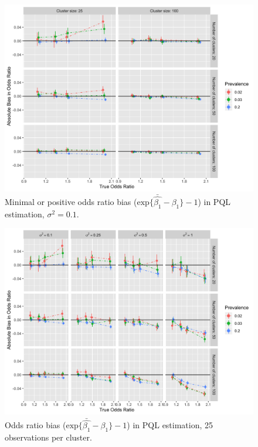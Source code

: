 \documentclass[Afour,times,sagev,doublespace]{sagej}
\begin{document}
\begin{figure}
\centering
\includegraphics[width=\linewidth]{_bias_pql_sbspt1.png}
  \caption{Minimal or positive odds ratio bias ($\text{exp} \{ \bar{\hat{\beta_1}} - \beta_1 \} - 1$) in PQL estimation, $\sigma^2=0.1$.}
    \label{fig:_bias_pql_sbs_pt1}
\end{figure}

\begin{figure}
\centering
\includegraphics[width=\linewidth]{_bias_pql_all_sbs.png}
  \caption{Odds ratio bias ($\text{exp} \{ \bar{\hat{\beta_1}} - \beta_1 \} - 1$) in PQL estimation, 25 observations per cluster.}
    \label{fig:_bias_pql_all_sbs}
\end{figure}
\end{document}

